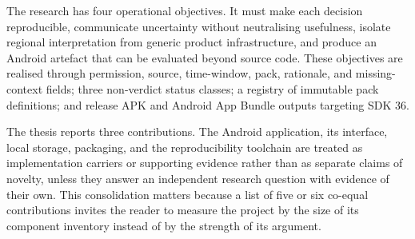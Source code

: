 The research has four operational objectives. It must make each decision reproducible, communicate uncertainty without neutralising usefulness, isolate regional interpretation from generic product infrastructure, and produce an Android artefact that can be evaluated beyond source code. These objectives are realised through permission, source, time-window, pack, rationale, and missing-context fields; three non-verdict status classes; a registry of immutable pack definitions; and release APK and Android App Bundle outputs targeting SDK 36.

The thesis reports three contributions. The Android application, its interface, local storage, packaging, and the reproducibility toolchain are treated as implementation carriers or supporting evidence rather than as separate claims of novelty, unless they answer an independent research question with evidence of their own. This consolidation matters because a list of five or six co-equal contributions invites the reader to measure the project by the size of its component inventory instead of by the strength of its argument.

